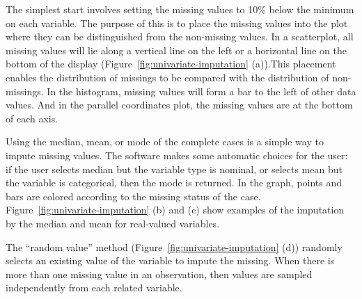 \documentclass[article]{jss}
\begin{document}
The simplest start involves setting the missing values to 10\%
below the minimum on each variable. The purpose of this is to
place the missing values into the plot where they can be
distinguished from the non-missing values. In a scatterplot,
all missing values will lie along a vertical line on the left
or a horizontal line on the bottom of the display
(Figure~\ref{fig:univariate-imputation} (a)).This placement
enables the distribution of missings to be compared with the
distribution of non-missings. In the histogram, missing values
will form a bar to the left of other data values. And in the
parallel coordinates plot, the missing values are at the bottom
of each axis. 

Using the median, mean, or mode of the complete cases is a simple
way to impute missing values. The software makes some automatic
choices for the user: if the user selects median but the variable
type is nominal, or selects mean but the variable is categorical,
then the mode is returned.  In the graph, points and bars are
colored according to the missing status of the case.
Figure~\ref{fig:univariate-imputation} (b) and (c) show examples
of the imputation by the median and mean for real-valued variables.

The ``random value'' method (Figure~\ref{fig:univariate-imputation}
(d)) randomly selects an existing value of the variable to impute
the missing. When there is more than one missing value in an
observation, then values are sampled independently from each
related variable.
\end{document}
